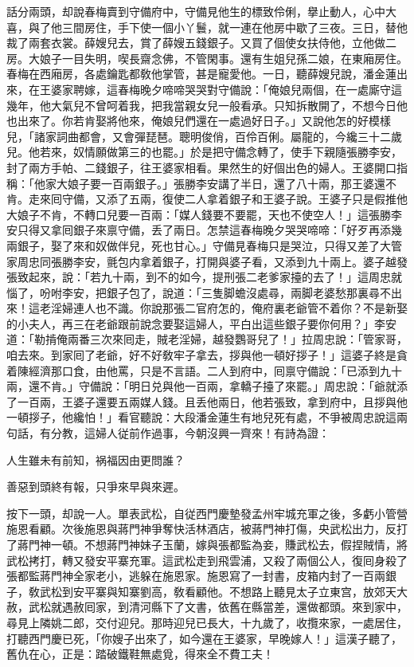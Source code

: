 話分兩頭，却說春梅賣到守備府中，守備見他生的標致伶俐，擧止動人，心中大喜，與了他三間房住，手下使一個小丫鬟，就一連在他房中歇了三夜。三日，替他裁了兩套衣裳。薛嫂兒去，賞了薛嫂五錢銀子。又買了個使女扶侍他，立他做二房。大娘子一目失明，喫長齋念佛，不管閑事。還有生姐兒孫二娘，在東廂房住。春梅在西廂房，各處鑰匙都敎他掌管，甚是寵愛他。一日，聽薛嫂兒說，潘金蓮出來，在王婆家聘嫁，這春梅晚夕啼啼哭哭對守備說：「俺娘兒兩個，在一處廝守這幾年，他大氣兒不曾呵着我，把我當親女兒一般看承。只知拆散開了，不想今日他也出來了。你若肯娶將他來，俺娘兒們還在一處過好日子。」又說他怎的好模樣兒，「諸家詞曲都會，又會彈琵琶。聰明俊俏，百伶百俐。屬龍的，今纔三十二歲兒。他若來，奴情願做第三的也罷。」於是把守備念轉了，使手下親隨張勝李安，封了兩方手帕、二錢銀子，往王婆家相看。果然生的好個出色的婦人。王婆開口指稱：「他家大娘子要一百兩銀子。」張勝李安講了半日，還了八十兩，那王婆還不肯。走來囘守備，又添了五兩，復使二人拿着銀子和王婆子說。王婆子只是假推他大娘子不肯，不轉口兒要一百兩：「媒人錢要不要罷，天也不使空人！」這張勝李安只得又拿囘銀子來禀守備，丢了兩日。怎禁這春梅晚夕哭哭啼啼：「好歹再添幾兩銀子，娶了來和奴做伴兒，死也甘心。」守備見春梅只是哭泣，只得又差了大管家周忠同張勝李安，氈包内拿着銀子，打開與婆子看，又添到九十兩上。婆子越發張致起來，說：「若九十兩，到不的如今，提刑張二老爹家擡的去了！」這周忠就惱了，吩咐李安，把銀子包了，說道：「三隻脚蟾沒處尋，兩脚老婆愁那裏尋不出來！這老淫婦連人也不識。你說那張二官府怎的，俺府裏老爺管不着你？不是新娶的小夫人，再三在老爺跟前說念要娶這婦人，平白出這些銀子要你何用？」李安道：「勒掯俺兩番三次來囘走，賊老淫婦，越發鸚哥兒了！」拉周忠說：「管家哥，咱去來。到家囘了老爺，好不好敎牢子拿去，拶與他一頓好拶子！」這婆子終是貪着陳經濟那口食，由他罵，只是不言語。二人到府中，囘禀守備說：「已添到九十兩，還不肯。」守備說：「明日兑與他一百兩，拿轎子擡了來罷。」周忠說：「爺就添了一百兩，王婆子還要五兩媒人錢。且丢他兩日，他若張致，拿到府中，且拶與他一頓拶子，他纔怕！」看官聽說：大段潘金蓮生有地兒死有處，不爭被周忠說這兩句話，有分教，這婦人従前作過事，今朝沒興一齊來！有詩為證：

人生雖未有前知，祸福因由更問誰？

善惡到頭終有報，只爭來早與來遲。

按下一頭，却說一人。單表武松，自従西門慶墊發孟州牢城充軍之後，多虧小管營施恩看顧。次後施恩與蔣門神爭奪快活林酒店，被蔣門神打傷，央武松出力，反打了蔣門神一頓。不想蔣門神妹子玉蘭，嫁與張都監為妾，賺武松去，假捏賊情，將武松拷打，轉又發安平寨充軍。這武松走到飛雲浦，又殺了兩個公人，復囘身殺了張都監蔣門神全家老小，逃躲在施恩家。施恩寫了一封書，皮箱内封了一百兩銀子，敎武松到安平寨與知寨劉高，敎看顧他。不想路上聽見太子立東宫，放郊天大赦，武松就遇赦囘家，到清河縣下了文書，依舊在縣當差，還做都頭。來到家中，尋見上隣姚二郎，交付迎兒。那時迎兒已長大，十九歲了，收攬來家，一處居住，打聽西門慶已死，「你嫂子出來了，如今還在王婆家，早晚嫁人！」這漢子聽了，舊仇在心，正是：踏破鐵鞋無處覓，得來全不費工夫！

